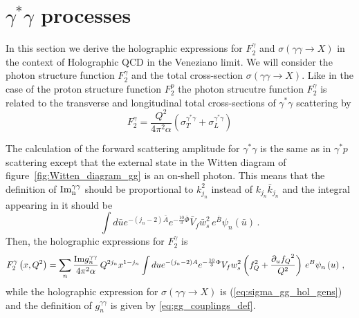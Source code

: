 \documentclass[a4paper,12pt]{article}
\begin{document}
\section{$\gamma^{*} \gamma$ processes}

In this section we derive the holographic expressions for $F_2^\gamma$ and $\sigma\left(\gamma \gamma \rightarrow X\right)$ in the context of Holographic QCD in the Veneziano limit. We will consider the photon structure function $F^{\gamma}_2$ and the total cross-section $\sigma\left(\gamma \gamma \to X\right)$. Like in the case of the proton structure function $F_2^p$ the photon strucutre function $F_2^\gamma$ is related to the transverse and longitudinal total cross-sections of $\gamma^{*}\gamma$ scattering by
\begin{equation}
F_2^\gamma = \frac{Q^2}{4 \pi^2 \alpha} \left( \sigma_T^{\gamma^* \gamma} + \sigma_L^{\gamma^* \gamma} \right)
\end{equation}

The calculation of the forward scattering amplitude for $\gamma^{*}\gamma$ is the same as in $\gamma^{*} p$ scattering except that the external state in the Witten diagram of figure~\ref{fig:Witten_diagram_gg} is an on-shell photon. This means that the definition of $\rm{Im}^{\gamma \gamma}_n$ should be proportional to $k^2_{j_n}$ instead of $k_{j_n}\bar{k}_{j_n}$ and the integral appearing in it should be
\begin{equation}
\int d\bar{u} e^{-\left(j_n - 2 \right) \bar{A} } e^{-\frac{10}{3} \bar{\Phi} } \bar{V}_{f}  \bar{w}_s^2  \, e^{\bar{B}} \psi_n\left(\bar{u}\right) \, .
\end{equation}
Then, the holographic expressions for $F_2^\gamma$ is
\begin{align}
&F^{\gamma}_2\left(x, Q^2\right) = \sum_n \frac{{\rm Im} g^{\gamma \gamma}_n}{4 \pi^2 \alpha} \, Q^{2 j_n} x^{1-j_n}  \int du e^{-\left(j_n - 2 \right)A } e^{-\frac{10}{3} \Phi} V_f w_s^2  \left(f_Q^2 +\frac{\partial_u{f_Q}^2}{Q^2} \right) \, e^B \psi_n\left(u\right) \, \label{eq:hol_f2_gamma} ,
\end{align}
while the holographic expression for $\sigma\left(\gamma \gamma \to X\right)$ is (\ref{eq:sigma_gg_hol_gens}) and the definition of $g^{\gamma \gamma}_n$ is given by \ref{eq:gg_couplings_def}.
\end{document}
